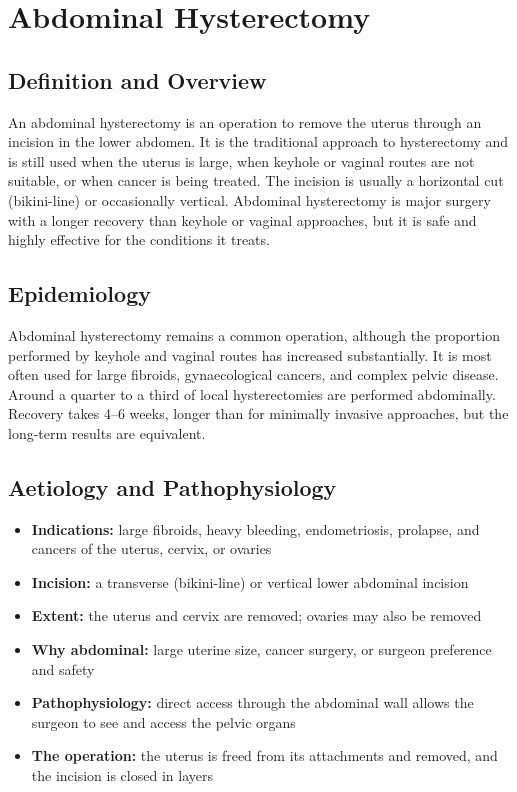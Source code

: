 \chapter{Abdominal Hysterectomy}

\section*{Definition and Overview}
An abdominal hysterectomy is an operation to remove the uterus through an incision in the lower abdomen. It is the traditional approach to hysterectomy and is still used when the uterus is large, when keyhole or vaginal routes are not suitable, or when cancer is being treated. The incision is usually a horizontal cut (bikini-line) or occasionally vertical. Abdominal hysterectomy is major surgery with a longer recovery than keyhole or vaginal approaches, but it is safe and highly effective for the conditions it treats.

\section*{Epidemiology}
Abdominal hysterectomy remains a common operation, although the proportion performed by keyhole and vaginal routes has increased substantially. It is most often used for large fibroids, gynaecological cancers, and complex pelvic disease. Around a quarter to a third of local hysterectomies are performed abdominally. Recovery takes 4--6 weeks, longer than for minimally invasive approaches, but the long-term results are equivalent.

\section*{Aetiology and Pathophysiology}
\begin{itemize}
    \item \textbf{Indications:} large fibroids, heavy bleeding, endometriosis, prolapse, and cancers of the uterus, cervix, or ovaries
    \item \textbf{Incision:} a transverse (bikini-line) or vertical lower abdominal incision
    \item \textbf{Extent:} the uterus and cervix are removed; ovaries may also be removed
    \item \textbf{Why abdominal:} large uterine size, cancer surgery, or surgeon preference and safety
    \item \textbf{Pathophysiology:} direct access through the abdominal wall allows the surgeon to see and access the pelvic organs
    \item \textbf{The operation:} the uterus is freed from its attachments and removed, and the incision is closed in layers
\end{itemize}


